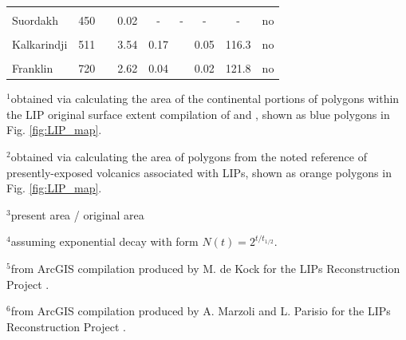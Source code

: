 \documentclass[11pt,letterpaper]{article}
\begin{document}
\begin{table}[h!]
{\begin{tabular}{lc>{\raggedright}p{4cm}cc>{\raggedright}p{4cm}ccl}
 & & & & & & & & \\
Suordakh & 450 & \cite{Khudoley2013a} & 0.02 & - & - & - & - & no \\
 & & & & & & & & \\
Kalkarindji & 511 & \cite{Jourdan2014a} & 3.54 & 0.17 & \cite{Thorne2014a} & 0.05 & 116.3 & no \\
 & & & & & & & & \\
Franklin & 720 & \cite{Denyszyn2009a} & 2.62 & 0.04 & \cite{Buchan2004a} & 0.02 & 121.8 & no \\
\bottomrule
\end{tabular}
}
\begin{tablenotes}
\vspace{0.15cm}
$^{1}$obtained via calculating the area of the continental portions of polygons within the LIP original surface extent compilation of \citet{Ernst2017a} and \citet{Ernst2019a}, shown as blue polygons in Fig. \ref{fig:LIP_map}.
\vspace{0.15cm}

$^{2}$obtained via calculating the area of polygons from the noted reference of presently-exposed volcanics associated with LIPs, shown as orange polygons in Fig. \ref{fig:LIP_map}.
\vspace{0.15cm}

$^{3}$present area / original area
\vspace{0.15cm}

$^{4}$assuming exponential decay with form $N(t) = 2^{t/t_{1/2}}$.
\vspace{0.15cm}

$^{5}$from ArcGIS compilation produced by M. de Kock for the LIPs Reconstruction Project \citep{Ernst2013a}.
\vspace{0.15cm}

$^{6}$from ArcGIS compilation produced by A. Marzoli and L. Parisio for the LIPs Reconstruction Project \citep{Ernst2013a}.
\end{tablenotes}
\label{tab:LIPs}
\end{table}
\end{document}
